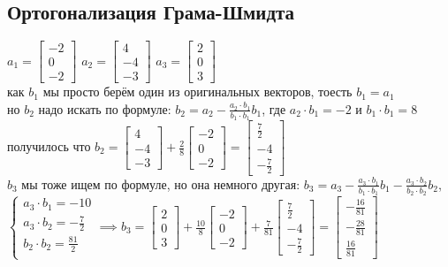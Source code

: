 \documentclass{article}
\newcommand{\ds}{\displaystyle}
\renewcommand{\f}{\frac}
\begin{document}
  \subsection{Ортогонализация Грама-Шмидта}
  \hfill $ a_1 = \begin{bmatrix}-2\\0\\-2\end{bmatrix} $ \hfill
  $ a_2 = \begin{bmatrix}4\\-4\\-3\end{bmatrix} $ \hfill
  $ a_3 = \begin{bmatrix}2\\0\\3\end{bmatrix} $ \hfill \hspace{0cm} \\
  как $b_1$ мы просто берём один из оригинальных векторов, тоесть $b_1 = a_1$ \\
  но $b_2$ надо искать по формуле: $\ds b_2 = a_2 - \f{a_2 \cdot b_1}{b_1 \cdot b_1}b_1$, где $a_2 \cdot b_1 = -2$ и $b_1 \cdot b_1 = 8$ \\
  получилось что $\ds b_2 = \begin{bmatrix}4\\-4\\-3\end{bmatrix} + \f{2}{8} \begin{bmatrix}-2\\0\\-2\end{bmatrix} = \begin{bmatrix}\f{7}{2}\\-4\\- \f{7}{2}\end{bmatrix}$ \\
  $b_3$ мы тоже ищем по формуле, но она немного другая: $\ds b_3 = a_3 - \f{a_3 \cdot b_1}{b_1 \cdot b_1}b_1 - \f{a_3 \cdot b_2}{b_2 \cdot b_2}b_2$, \\
  $\begin{cases}
    a_3 \cdot b_1 = -10 \\
    a_3 \cdot b_2 = -\f{7}{2} \\
    b_2 \cdot b_2 = \f{81}{2} \\
  \end{cases} \implies b_3 = \begin{bmatrix}2\\0\\3\end{bmatrix} + \f{10}{8} \begin{bmatrix}-2\\0\\-2\end{bmatrix} + \f{7}{81} \begin{bmatrix}\f{7}{2}\\-4\\- \f{7}{2}\end{bmatrix} = \begin{bmatrix}- \frac{16}{81}\\- \frac{28}{81}\\\frac{16}{81}\end{bmatrix}$ \\
\end{document}
